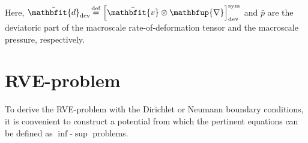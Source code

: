 \documentclass[notitlepage,a4paper,fleqn,9pt]{extarticle}
\renewcommand{\ta}[1]{\mathbfit{#1}}
\renewcommand{\ts}[1]{\mathbfit{#1}}
\renewcommand{\tf}[1]{\mathbfsfup{#1}}
\renewcommand{\diff}{\mathbfup{\nabla}}
\newcommand{\ded}{\mathrm{d}}
\newcommand{\dep}{\mathrm{p}}
\begin{document}
\begin{multicols}{2}
Here, $\bar{\ts d}_\dev\!\defeq \left[\bar{\ta v}\outerp \diff\right]^\sym_\dev$ and $\bar{p}$ are the deviatoric part of the macroscale rate-of-deformation tensor and the macroscale pressure, respectively.


\section{RVE-problem}
To derive the RVE-problem with the Dirichlet or Neumann boundary conditions, it is convenient to construct a potential from which the pertinent equations can be defined as $\inf$-$\sup$ problems.


\end{multicols}
\end{document}
